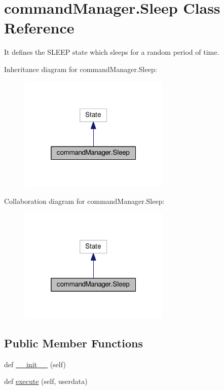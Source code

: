 \hypertarget{classcommandManager_1_1Sleep}{}\section{command\+Manager.\+Sleep Class Reference}
\label{classcommandManager_1_1Sleep}


It defines the S\+L\+E\+EP state which sleeps for a random period of time.  




Inheritance diagram for command\+Manager.\+Sleep\+:\nopagebreak
\begin{figure}[H]
\begin{center}
\leavevmode
\includegraphics[width=205pt]{classcommandManager_1_1Sleep__inherit__graph}
\end{center}
\end{figure}


Collaboration diagram for command\+Manager.\+Sleep\+:\nopagebreak
\begin{figure}[H]
\begin{center}
\leavevmode
\includegraphics[width=205pt]{classcommandManager_1_1Sleep__coll__graph}
\end{center}
\end{figure}
\subsection*{Public Member Functions}
\begin{DoxyCompactItemize}
\item 
def \hyperlink{classcommandManager_1_1Sleep_aa31bb1cc360e9bb1d723eaf953295268}{\+\_\+\+\_\+init\+\_\+\+\_\+} (self)
\item 
def \hyperlink{classcommandManager_1_1Sleep_a01a1b33499ec3c862bed42a6258b0f12}{execute} (self, userdata)
\end{DoxyCompactItemize}
